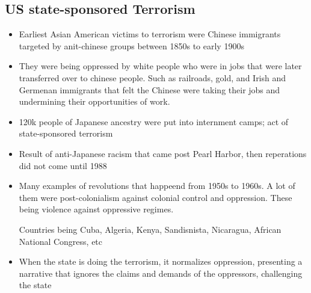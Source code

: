 \documentclass{article}
\begin{document}
\subsection{US state-sponsored Terrorism}
\begin{itemize}
\item Earliest Asian American victims to terrorism were Chinese immigrants
  targeted by anit-chinese groups between 1850s to early 1900s
\item They were being oppressed by white people who were in jobs that were later transferred over
  to chinese people. Such as railroads, gold, and Irish and Germenan immigrants
  that felt the Chinese were taking their jobs and undermining their opportunities of work.
\item 120k people of Japanese ancestry were put into internment camps;
  act of state-sponsored terrorism
\item Result of anti-Japanese racism that came post Pearl Harbor,
  then reperations did not come until 1988
  \item Many examples of revolutions that happeend from 1950s to 1960s.
    A lot of them were post-colonialism against colonial control and oppression.
    These being violence against oppressive regimes.

    Countries being Cuba, Algeria, Kenya, Sandisnista, Nicaragua, African National Congress, etc
  \item When the state is doing the terrorism, it normalizes oppression, presenting
    a narrative that ignores the claims and demands of the oppressors, challenging the state
\end{itemize}
\end{document}
